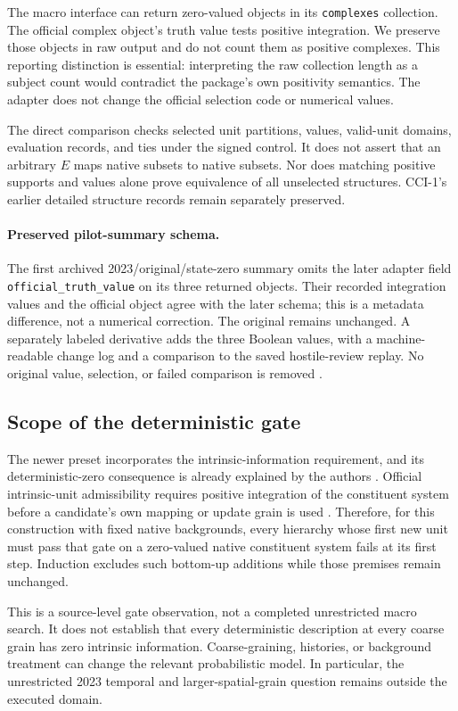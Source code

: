 \documentclass[11pt]{article}
\theoremstyle{definition}\newtheorem{definition}[theorem]{Definition}
\theoremstyle{remark}\newtheorem{remark}[theorem]{Remark}
\begin{document}
The macro interface can return zero-valued objects in its \texttt{complexes} collection. The official complex object's truth value tests positive integration. We preserve those objects in raw output and do not count them as positive complexes. This reporting distinction is essential: interpreting the raw collection length as a subject count would contradict the package's own positivity semantics. The adapter does not change the official selection code or numerical values.

The direct comparison checks selected unit partitions, values, valid-unit domains, evaluation records, and ties under the signed control. It does not assert that an arbitrary $E$ maps native subsets to native subsets. Nor does matching positive supports and values alone prove equivalence of all unselected structures. CCI-1's earlier detailed structure records remain separately preserved.

\paragraph{Preserved pilot-summary schema.}
The first archived 2023/original/state-zero summary omits the later adapter field \texttt{official\_truth\_value} on its three returned objects. Their recorded integration values and the official object agree with the later schema; this is a metadata difference, not a numerical correction. The original remains unchanged. A separately labeled derivative adds the three Boolean values, with a machine-readable change log and a comparison to the saved hostile-review replay. No original value, selection, or failed comparison is removed \cite{support}.

\subsection{Scope of the deterministic gate}
The newer preset incorporates the intrinsic-information requirement, and its deterministic-zero consequence is already explained by the authors \cite{mayner}. Official intrinsic-unit admissibility requires positive integration of the constituent system before a candidate's own mapping or update grain is used \cite{intrinsic}. Therefore, for this construction with fixed native backgrounds, every hierarchy whose first new unit must pass that gate on a zero-valued native constituent system fails at its first step. Induction excludes such bottom-up additions while those premises remain unchanged.

This is a source-level gate observation, not a completed unrestricted macro search. It does not establish that every deterministic description at every coarse grain has zero intrinsic information. Coarse-graining, histories, or background treatment can change the relevant probabilistic model. In particular, the unrestricted 2023 temporal and larger-spatial-grain question remains outside the executed domain.
\end{document}
